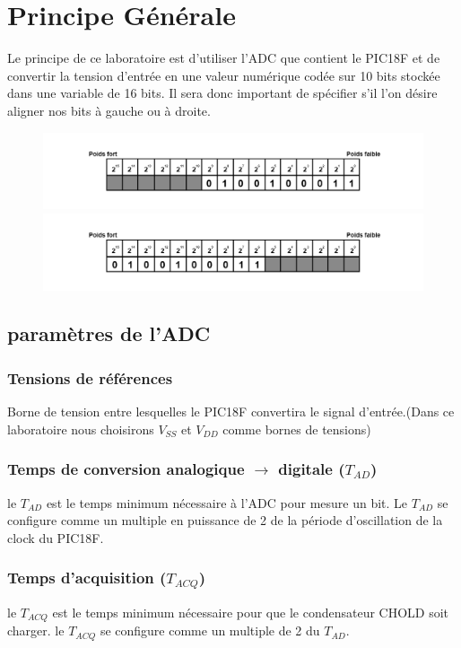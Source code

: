 \section{Principe Générale}
Le principe de ce laboratoire est d'utiliser l'ADC que contient le PIC18F et de convertir la tension d'entrée en une valeur numérique codée sur 10 bits stockée dans une variable de 16 bits. Il sera donc important de spécifier s'il l'on désire aligner nos bits à gauche ou à droite.

\begin{figure}
\begin{center}
\includegraphics[scale=0.8]{images/aligndroite.png}
\includegraphics[scale=0.8]{images/aligngauche.png}
\end{center}
\end{figure}

\subsection{paramètres de l'ADC}

\subsubsection*{Tensions de références}
Borne de tension entre lesquelles le PIC18F convertira le signal d'entrée.(Dans ce laboratoire nous choisirons  $V_{SS}$ et $V_{DD}$ comme bornes de tensions)
\subsubsection*{Temps de conversion analogique $\rightarrow$ digitale  ($T_{AD}$)}
le $T_{AD}$  est le temps minimum nécessaire à l'ADC pour mesure un bit. Le $T_{AD}$ se configure comme un multiple en puissance de 2 de la période d'oscillation de la clock du PIC18F.
\subsubsection*{Temps d'acquisition ($T_{ACQ}$)}
le $T_{ACQ}$ est le temps minimum nécessaire pour que le condensateur CHOLD soit charger. le $T_{ACQ}$  se configure comme un multiple de 2 du $T_{AD}$. 
 
